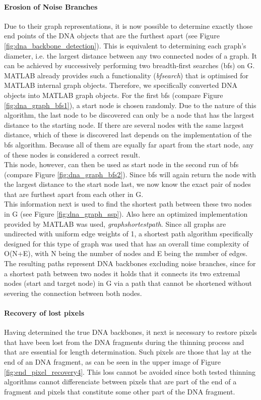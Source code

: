 \documentclass{article}
\begin{document}
\paragraph{Erosion of Noise Branches}\label{sec:Erosion of Noise Branches}
Due to their graph representations, it is now possible to determine exactly those end points of the DNA objects that are the furthest apart (see Figure \ref{fig:dna_backbone_detection}). This is equivalent to determining each graph's diameter, i.e. the largest distance between any two connected nodes of a graph. It can be achieved by successively performing two breadth-first searches (bfs) on G. MATLAB already provides such a functionality (\textit{bfsearch}) that is optimised for MATLAB internal graph objects. Therefore, we specifically converted DNA objects into MATLAB graph objects. For the first bfs (compare Figure \ref{fig:dna_graph_bfs1}), a start node is chosen randomly. Due to the nature of this algorithm, the last node to be discovered can only be a node that has the largest distance to the starting node. If there are several nodes with the same largest distance, which of these is discovered last depends on the implementation of the bfs algorithm. Because all of them are equally far apart from the start node, any of these nodes is considered a correct result.\\
This node, however, can then be used as start node in the second run of bfs (compare Figure \ref{fig:dna_graph_bfs2}). Since bfs will again return the node with the largest distance to the start node last, we now know the exact pair of nodes that are furthest apart from each other in G.\\
This information next is used to find the shortest path between these two nodes in G (see Figure \ref{fig:dna_graph_ssp}). Also here an optimized implementation provided by MATLAB was used, \textit{graphshortestpath}. Since all graphs are undirected with uniform edge weights of 1, a shortest path algorithm specifically designed for this type of graph was used that has an overall time complexity of O(N+E), with N being the number of nodes and E being the number of edges.
The resulting paths represent DNA backbones excluding noise branches, since for a shortest path between two nodes it holds that it connects its two extremal nodes (start and target node) in G via a path that cannot be shortened without severing the connection between both nodes.

\paragraph{Recovery of lost pixels}\label{sec:PixelRecovery}
Having determined the true DNA backbones, it next is necessary to restore pixels that have been lost from the DNA fragments during the thinning process and that are essential for length determination. Such pixels are those that lay at the end of an DNA fragment, as can be seen in the upper image of Figure \ref{fig:end_pixel_recovery4}. This loss cannot be avoided since both tested thinning algorithms cannot differenciate between pixels that are part of the end of a fragment and pixels that constitute some other part of the DNA fragment. 
\end{document}
